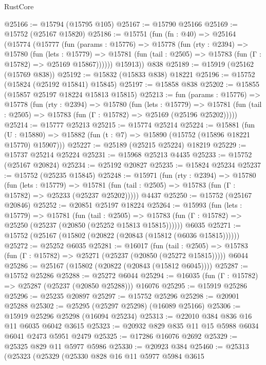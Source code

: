 \begin{lexlean}{RustCore}
\begin{coremodule}
@25166 := @15794 (@15795 @105)
@25167 := @15790 @25166
@25169 := @15752 (@25167 @15820)
@25186 := @15751
    (fun (fn : @40) =>
    @25164
      (@15774
        (@15777
          (fun (params : @15776) =>
          @15778
            (fun (rty : @2394) =>
            @15780
              (fun (lets : @15779) =>
              @15781 (fun (tail : @2505) => @15783 (fun (Γ : @15782) => @25169 @15867))))))
        @15913))
    @838
@25189 := @15919 (@25162 (@15769 @838))
@25192 := @15832 (@15833 @838) @18221
@25196 := @15752 (@15824 (@25192 @15841) @15845)
@25197 := @15858 @838
@25202 := @15855 (@15857 @25197 @18224 @15813 @15815)
@25213 := fun (params : @15776) =>
  @15778
    (fun (rty : @2394) =>
    @15780
      (fun (lets : @15779) =>
      @15781 (fun (tail : @2505) => @15783 (fun (Γ : @15782) => @25169 (@25196 @25202)))))
@25214 := @15777 @25213
@25215 := @15774 @25214
@25224 := @15881
    (fun (U : @15880) => @15882 (fun (t : @7) => @15890 (@15752 (@15896 @18221 @15770) @15907)))
@25227 := @25189 (@25215 @25224) @18219
@25229 := @15737 @25214 @25224
@25231 := @15968 @25213 @4435
@25233 := @15752 (@25167 @20824)
@25234 := @25192 @20827
@25235 := @15824 @25234
@25237 := @15752 (@25235 @15845)
@25248 := @15971
    (fun (rty : @2394) =>
    @15780
      (fun (lets : @15779) =>
      @15781 (fun (tail : @2505) => @15783 (fun (Γ : @15782) => @25233 (@25237 @25202)))))
    @4437
@25250 := @15752 (@25167 @20846)
@25252 := @20851 @25197 @18224
@25264 := @15993
    (fun (lets : @15779) =>
    @15781
      (fun (tail : @2505) =>
      @15783 (fun (Γ : @15782) => @25250 (@25237 (@20850 (@25252 @15813 @15815))))))
    @6035
@25271 := @15752 (@25167 (@15802 (@20822 (@20843 (@15812 (@6036 @15815))))))
@25272 := @25252 @6035
@25281 := @16017
    (fun (tail : @2505) => @15783 (fun (Γ : @15782) => @25271 (@25237 (@20850 (@25272 @15815)))))
    @6044
@25286 := @25167 (@15802 (@20822 (@20843 (@15812 @6045))))
@25287 := @15752 @25286
@25288 := @25272 @6044
@25294 := @16035 (fun (Γ : @15782) => @25287 (@25237 (@20850 @25288))) @16076
@25295 := @15919 @25286
@25296 := @25235 @20897
@25297 := @15752 @25296
@25298 := @20901 @25288
@25302 := @25295 (@25297 @25298) (@16089 @25166)
@25306 := @15919 @25296 @25298 (@16094 @25234)
@25313 := @22010 @384 @836 @16 @11 @6035 @6042 @3615
@25323 := @20932 @829 @835 @11 @15 @5988 @6034 @6041 @2473 @5951 @2479
@25325 := @17286 @16076 @2692
@25329 := @25325 @829 @11 @5977 @5986
@25330 := @20923 @384
@25460 := @25313
    (@25323
      (@25329
        (@25330
          @828
          @16
          @11
          @5977
          @5984
          @3615

\end{coremodule}
\end{lexlean}

